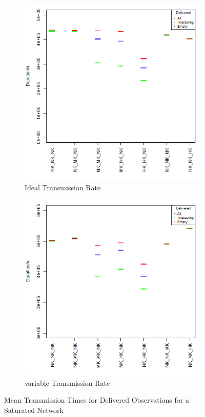 \begin{figure}[H]
\centering
\begin{subfigure}{\textwidth}
  \centering
  \includegraphics[height=.5\textheight]{Chap7/figures/plots/saturated_ideal/delivered_mean.png}
  \caption{Ideal Transmission Rate}
	\label{fig:sim:res:sat:ideal:delmean}
\end{subfigure}%
\vfill
\begin{subfigure}{\textwidth}
  \centering
  \includegraphics[height=.5\textheight]{Chap7/figures/plots/saturated_variable/delivered_mean.png}
  \caption{variable Transmission Rate}
	\label{fig:sim:res:sat:variable:delmean}
\end{subfigure}
\caption{Mean Transmission Times for Delivered Observations for a Saturated Network}
\end{figure}
	
